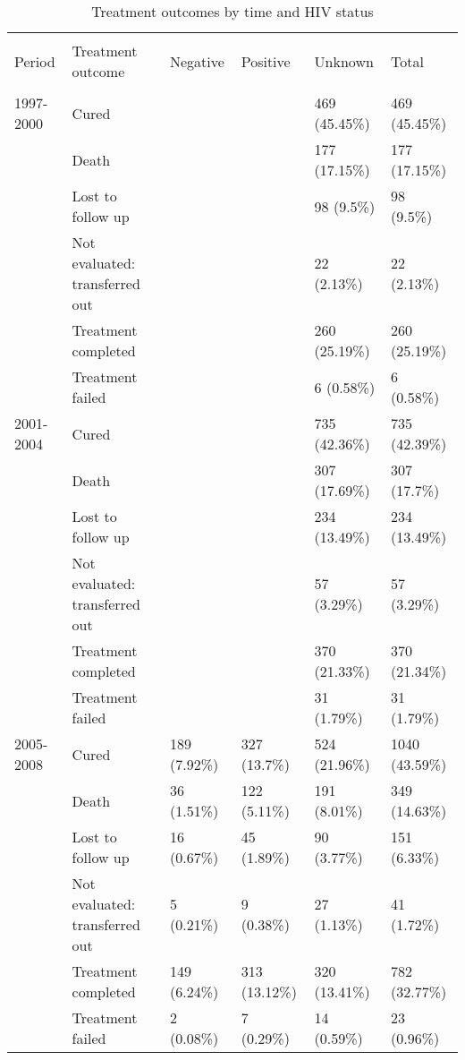 \documentclass{article}
\begin{document}


\begin{landscape}

\begin{table}[!htbp] \centering 
  \caption{Treatment outcomes by time and HIV status} 
  \label{} 
\begin{tabular}{@{\extracolsep{5pt}} llllll} 
\\[-1.8ex]\hline 
\hline \\[-1.8ex] 
Period & Treatment outcome & Negative & Positive & Unknown & Total \\ 
\hline \\[-1.8ex] 
1997-2000 & Cured &  &  & 469 (45.45\%) & 469 (45.45\%) \\ 
 & Death &  &  & 177 (17.15\%) & 177 (17.15\%) \\ 
 & Lost to follow up &  &  & 98 (9.5\%) & 98 (9.5\%) \\ 
 & Not evaluated: transferred out &  &  & 22 (2.13\%) & 22 (2.13\%) \\ 
 & Treatment completed &  &  & 260 (25.19\%) & 260 (25.19\%) \\ 
 & Treatment failed &  &  & 6 (0.58\%) & 6 (0.58\%) \\ 
2001-2004 & Cured &  &  & 735 (42.36\%) & 735 (42.39\%) \\ 
 & Death &  &  & 307 (17.69\%) & 307 (17.7\%) \\ 
 & Lost to follow up &  &  & 234 (13.49\%) & 234 (13.49\%) \\ 
 & Not evaluated: transferred out &  &  & 57 (3.29\%) & 57 (3.29\%) \\ 
 & Treatment completed &  &  & 370 (21.33\%) & 370 (21.34\%) \\ 
 & Treatment failed &  &  & 31 (1.79\%) & 31 (1.79\%) \\ 
2005-2008 & Cured & 189 (7.92\%) & 327 (13.7\%) & 524 (21.96\%) & 1040 (43.59\%) \\ 
 & Death & 36 (1.51\%) & 122 (5.11\%) & 191 (8.01\%) & 349 (14.63\%) \\ 
 & Lost to follow up & 16 (0.67\%) & 45 (1.89\%) & 90 (3.77\%) & 151 (6.33\%) \\ 
 & Not evaluated: transferred out & 5 (0.21\%) & 9 (0.38\%) & 27 (1.13\%) & 41 (1.72\%) \\ 
 & Treatment completed & 149 (6.24\%) & 313 (13.12\%) & 320 (13.41\%) & 782 (32.77\%) \\ 
 & Treatment failed & 2 (0.08\%) & 7 (0.29\%) & 14 (0.59\%) & 23 (0.96\%) \\ 

\end{tabular}
\end{table}
\end{landscape}
\end{document}
